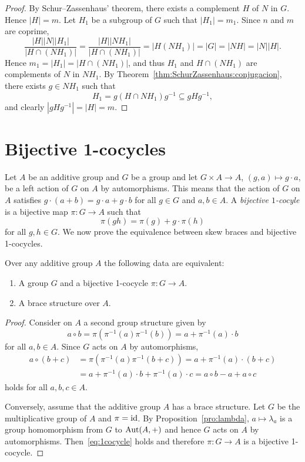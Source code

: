 \begin{proof}
	By Schur--Zassenhaus' theorem, there exists a complement $H$ of $N$ in $G$. Hence $|H|=m$. Let $H_1$ be a subgroup of $G$ such that $|H_1|=m_1$. 
	Since $n$ and $m$ are coprime, 
	\[
	\frac{|H||N||H_1|}{|H\cap (NH_1)|}=
	\frac{|H||NH_1|}{|H\cap (NH_1)|}=|H(NH_1)|=|G|=|NH|=|N||H|.
	\]
	Hence $m_1=|H_1|=|H\cap (NH_1)|$, and thus $H_1$ and $H\cap (NH_1)$ are complements of $N$ in $NH_1$. By Theorem~\ref{thm:SchurZassenhaus:conjugacion}, there exists $g\in NH_1$ such that 
	\[
	H_1=g(H\cap NH_1)g^{-1}\subseteq gHg^{-1},
	\]
	and clearly $|gHg^{-1}|=|H|=m$. 
\end{proof}

\section{Bijective 1-cocycles}

Let $A$ be an additive group and $G$ be a group and let 
$G\times A\to A$, $(g,a)\mapsto g\cdot a$,
be a left action of $G$ on $A$ by automorphisms. This means that the action of $G$ on $A$ satisfies 
$g\cdot (a+b)=g\cdot a+g\cdot b$ for all $g\in G$ and $a,b\in A$.
A \emph{bijective
$1$-cocyle} is a bijective map $\pi\colon G\to A$ such that 
\begin{equation}
    \label{eq:1cocycle}
    \pi(gh)=\pi(g)+g\cdot \pi(h)
\end{equation}
for all $g,h\in G$. 
We now prove the equivalence between skew braces and bijective 1-cocycles. 

\begin{theorem}
	\label{thm:1cocycle}
    Over any additive group $A$ the following data are equivalent:
    \begin{enumerate}
        \item A group $G$ and a bijective
            1-cocycle $\pi\colon G\to A$. 
        \item A brace structure over $A$. 
    \end{enumerate}

    \begin{proof}
        Consider on $A$ a second group structure given by 
        \[
		a\circ b=\pi(\pi^{-1}(a)\pi^{-1}(b))=a+\pi^{-1}(a)\cdot b
		\]
		for all
        $a,b\in A$.  Since $G$ acts on $A$ by
        automorphisms, 
        \begin{align*}
            a\circ (b+c)&=\pi(\pi^{-1}(a)\pi^{-1}(b+c))=a+\pi^{-1}(a)\cdot (b+c)\\
            &=a+ \pi^{-1}(a)\cdot b+\pi^{-1}(a)\cdot c
            =a\circ b-a+a\circ c
        \end{align*}
        holds for all $a,b,c\in A$.
        
        Conversely, assume that the additive group $A$ has a brace structure. Let $G$ be the multiplicative group of $A$
        and $\pi=\operatorname{id}$. By
        Proposition~\ref{pro:lambda}, $a\mapsto\lambda_a$ is a group homomorphism from $G$ to $\operatorname{Aut}(A,+)$ and 
        hence $G$ acts on $A$ by automorphisms. Then~\eqref{eq:1cocycle} holds
        and therefore $\pi\colon G\to A$ is a bijective 1-cocycle. 
    \end{proof}
\end{theorem}

